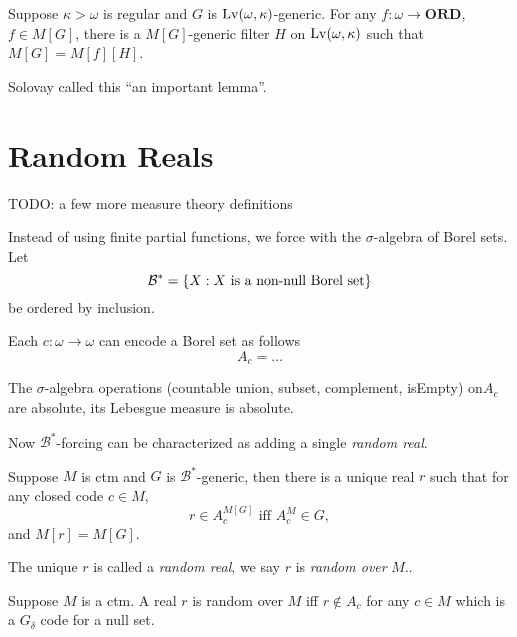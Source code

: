 \begin{lemma}
    Suppose \(\kappa>\omega\) is regular and \(G\) is \(\operatorname{Lv}(\omega,\kappa)\)-generic.
    For any \(f:\omega\to\mathbf{ORD}\), \(f\in M[G]\),
    there is a \(M[G]\)-generic filter \(H\) on \(\operatorname{Lv}(\omega,\kappa)\)
    such that \(M[G] = M[f][H]\).
\end{lemma}
Solovay called this ``an important lemma''.






\section{Random Reals}

\newcommand*{\B}{{\mathcal{B}}}

TODO: a few more measure theory definitions

Instead of using finite partial functions, we force with the \(\sigma\)-algebra of Borel sets.
Let \[ \B^* = \set{ X: X \text{ is a non-null Borel set}} \]
be ordered by inclusion.

\begin{definition}
    Each \(c:\omega\to\omega\) can encode a Borel set as follows
    \[ A_c = \dots \]
\end{definition}

\begin{proposition}
    The \(\sigma\)-algebra operations (countable union, subset, complement, isEmpty) on\(A_c\) are absolute,
    its Lebesgue measure is absolute.
\end{proposition}

Now \(\B^*\)-forcing can be characterized as adding a single \emph{random real}.

\begin{theorem}
    Suppose \(M\) is ctm and \(G\) is \(\B^*\)-generic,
    then there is a unique real \(r\) such that for any closed code \(c\in M\),
    \[ r\in A_c^{M[G]} \text{ iff } A_c^M \in G, \]
    and \(M[r] = M[G]\).
\end{theorem}

The unique \(r\) is called a \emph{random real},
we say \(r\) is \emph{random over} \(M\)..

\begin{theorem}
    Suppose \(M\) is a ctm. A real \(r\) is random over \(M\) iff
    \(r\notin A_c\) for any \(c\in M\) which is a \(G_\delta\) code for a null set.
\end{theorem}

